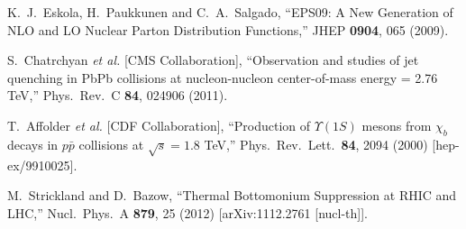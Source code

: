 \documentclass[12pt,a4paper,final]{iopart} %
\begin{document}
\begin{thebibliography}{100}
  K.~J.~Eskola, H.~Paukkunen and C.~A.~Salgado,
  ``EPS09: A New Generation of NLO and LO Nuclear Parton Distribution Functions,''
  JHEP {\bf 0904}, 065 (2009).






  

  

  S.~Chatrchyan {\it et al.}  [CMS Collaboration],
  ``Observation and studies of jet quenching in PbPb collisions at nucleon-nucleon center-of-mass energy = 2.76 TeV,''
  Phys.\ Rev.\ C {\bf 84}, 024906 (2011).


  T.~Affolder {\it et al.} [CDF Collaboration],
  ``Production of $\Upsilon(1S)$ mesons from $\chi_b$ decays in $p\bar{p}$ collisions at $\sqrt{s} = 1.8$ TeV,''
  Phys.\ Rev.\ Lett.\  {\bf 84}, 2094 (2000)
  [hep-ex/9910025].
  
  M.~Strickland and D.~Bazow,
  ``Thermal Bottomonium Suppression at RHIC and LHC,''
  Nucl.\ Phys.\ A {\bf 879}, 25 (2012)
  [arXiv:1112.2761 [nucl-th]].
  






\end{thebibliography}
\end{document}

